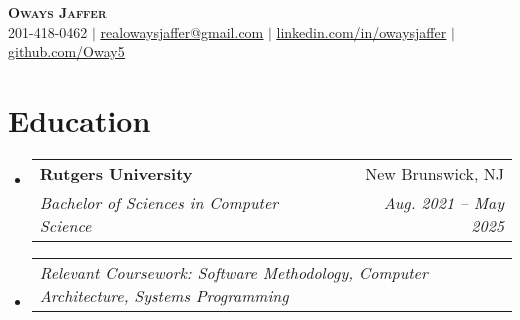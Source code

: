 \documentclass[letterpaper,12pt]{article}
\makeatletter
\newcommand{\resumeSubheading}[4]{
  \vspace{-2pt}\item
    \begin{tabular*}{0.97\textwidth}[t]{l@{\extracolsep{\fill}}r}
      \textbf{#1} & #2 \\
      \textit{\small#3} & \textit{\small #4} \\
    \end{tabular*}\vspace{-7pt}
}
\newcommand{\resumeSubheadingCoursework}[1]{
  \item
    \begin{tabular*}{0.97\textwidth}{l@{\extracolsep{\fill}}r}
      \textit{\small#1} \\
    \end{tabular*}\vspace{-7pt}
}
\newcommand{\resumeSubHeadingListStart}{\begin{itemize}[leftmargin=0.15in, label={}]}
\newcommand{\resumeSubHeadingListEnd}{\end{itemize}}
\makeatother
\begin{document}
\begin{center}
    \textbf{ \scshape Oways Jaffer} \\ \vspace{1pt}
    \small 201-418-0462 $|$ \href{mailto:realowaysjaffer@gmail.com}{\underline{realowaysjaffer@gmail.com}} $|$ 
    \href{https://linkedin.com/in/oways}{\underline{linkedin.com/in/owaysjaffer}} $|$
    \href{https://github.com/oway5}{\underline{github.com/Oway5}}
\end{center}


\section{Education}
  \resumeSubHeadingListStart
    \resumeSubheading
      {Rutgers University}{New Brunswick, NJ}
      {Bachelor of Sciences in Computer Science}{Aug. 2021 -- May 2025}
      \resumeSubheadingCoursework
      {Relevant Coursework: Software Methodology, Computer Architecture, Systems Programming}
    
  \resumeSubHeadingListEnd


\end{document}
